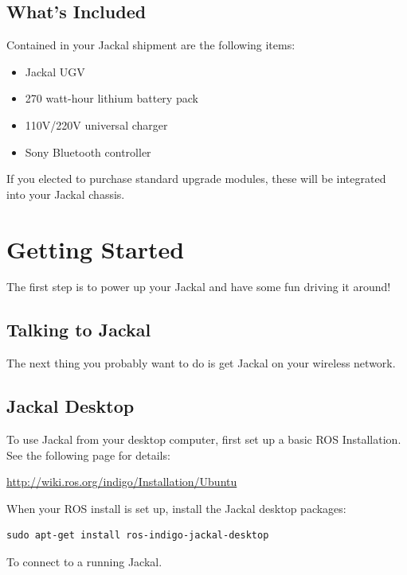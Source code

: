 \documentclass[]{clearpath-user-manual}
\begin{document}
\subsection{What's Included}

Contained in your Jackal shipment are the following items:

\begin{itemize}
  \item Jackal UGV
  \item 270 watt-hour lithium battery pack
  \item 110V/220V universal charger
  \item Sony Bluetooth controller
\end{itemize}

If you elected to purchase standard upgrade modules, these will be integrated into your Jackal chassis.

\section{Getting Started}

The first step is to power up your Jackal and have some fun driving it around!

\subsection{Talking to Jackal}

The next thing you probably want to do is get Jackal on your wireless network.

\subsection{Jackal Desktop}

To use Jackal from your desktop computer, first set up a basic ROS Installation. See the following
page for details:

\url{http://wiki.ros.org/indigo/Installation/Ubuntu}

When your ROS install is set up, install the Jackal desktop packages:

\begin{lstlisting}
sudo apt-get install ros-indigo-jackal-desktop
\end{lstlisting}

To connect to a running Jackal.
\end{document}
